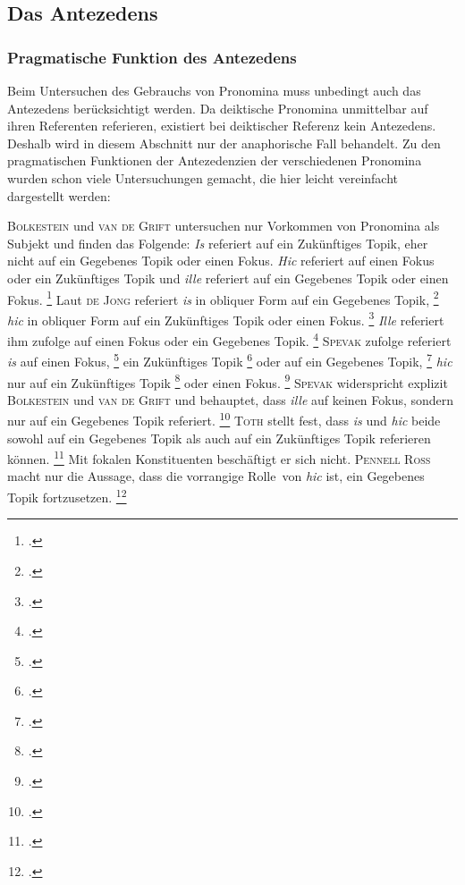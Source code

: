 \documentclass[12pt]{article}
\newcommand{\lat}[1]{\textit{#1}} %
\begin{document}
\subsection{Das Antezedens}
\label{antez}

\subsubsection{Pragmatische Funktion des Antezedens}

Beim Untersuchen des Gebrauchs von Pronomina muss unbedingt auch das Antezedens berücksichtigt werden.
Da deiktische Pronomina unmittelbar auf ihren Referenten referieren, existiert bei deiktischer Referenz kein Antezedens. Deshalb wird in diesem Abschnitt nur der anaphorische Fall behandelt.
Zu den pragmatischen Funktionen der Antezedenzien der verschiedenen Pronomina wurden schon viele Untersuchungen gemacht, die hier leicht vereinfacht dargestellt werden:

\textsc{Bolkestein} und \textsc{van de Grift} untersuchen nur Vorkommen von Pronomina als Subjekt und finden das Folgende: 
	\lat{Is} referiert auf ein Zukünftiges Topik, eher nicht auf ein Gegebenes Topik oder einen Fokus. 
	\lat{Hic} referiert auf einen Fokus oder ein Zukünftiges Topik und \lat{ille} referiert auf ein Gegebenes Topik oder einen Fokus.
	\footcite[hier S.\,287--289]{bolkestein94}
Laut \textsc{de Jong} referiert \lat{is} in obliquer Form auf ein Gegebenes Topik,
	\footcite[hier S.\,506]{dejong96}
	\lat{hic} in obliquer Form auf ein Zukünftiges Topik oder einen Fokus.
	\footcite[hier S.\,504f.]{dejong96}
	\lat{Ille} referiert ihm zufolge auf einen Fokus oder ein Gegebenes Topik.
	\footcite[hier S.\,504]{dejong96}
\textsc{Spevak} zufolge referiert \lat{is} auf einen Fokus,
	\footcite[S.\,76f.]{spevak}
	ein Zukünftiges Topik
	\footcite[S.\,58]{spevak}
	oder auf ein Gegebenes Topik,
	\footcite[S.\,80]{spevak}
	\lat{hic} nur auf ein Zukünftiges Topik
	\footcite[S.\,57f.]{spevak}
	oder einen Fokus.
	\footcite[S.\,76f.]{spevak}
	\textsc{Spevak} widerspricht explizit \textsc{Bolkestein} und \textsc{van de Grift} und behauptet, dass \lat{ille} auf keinen Fokus, sondern nur auf ein Gegebenes Topik referiert.
	\footcite[S.\,89]{spevak}
\textsc{Toth} stellt fest, dass \lat{is} und \lat{hic} beide sowohl auf ein Gegebenes Topik als auch auf ein Zukünftiges Topik referieren können.
	\footcite[hier S.\,180--182]{toth94}
	Mit fokalen Konstituenten beschäftigt er sich nicht.
\textsc{Pennell Ross} macht nur die Aussage, dass die \glqq vorrangige Rolle\grqq\ von \lat{hic} ist, ein Gegebenes Topik fortzusetzen.
	\footcite[hier S.\,515]{ross96}
\end{document}
